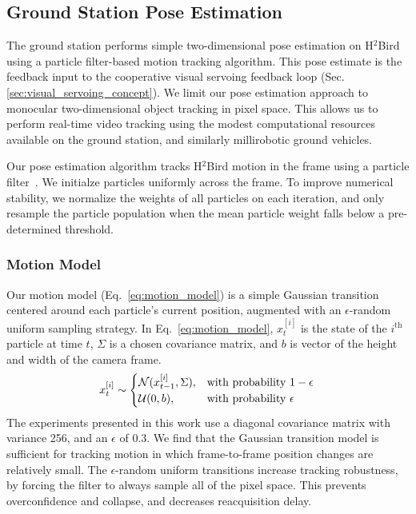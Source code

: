 \documentclass{aamas2013}
\begin{document}
\subsection{Ground Station Pose Estimation}
The ground station performs simple two-dimensional pose estimation on 
H$^2$Bird using a particle filter-based motion tracking algorithm. This pose 
estimate is the feedback input to the cooperative visual servoing feedback 
loop (Sec. \ref{sec:visual_servoing_concept}). We limit our pose estimation 
approach to monocular two-dimensional object tracking in pixel space. This 
allows us to perform real-time video tracking using the modest computational 
resources available on the ground station, and similarly millirobotic ground 
vehicles.

Our pose estimation algorithm tracks H$^2$Bird motion in the frame using a 
particle filter~\cite{thrun2005probabilistic}. We initialze particles 
uniformly across the frame. To improve numerical stability, we  normalize the 
weights of all particles on each iteration, and only resample the particle 
population when the mean particle weight falls below a pre-determined 
threshold.

\subsubsection{Motion Model}
Our motion model (Eq.~\ref{eq:motion_model}) is a simple Gaussian transition 
centered around each particle's current position, augmented with an 
$\epsilon$-random uniform sampling strategy. In Eq.~\ref{eq:motion_model}, 
$x^{[i]}_t$ is the state of the $i^\text{th}$ particle at time $t$, $\Sigma$ 
is a chosen covariance matrix, and $b$ is vector of the height and width of 
the camera frame.
\begin{equation}
\label{eq:motion_model}
x^{[i]}_t \sim \begin{cases}
\mathcal{N}(x^{[i]}_{t-1}, \Sigma), &\text{with probability } 1-\epsilon \\
\mathcal{U}(0,b),& \text{with probability } \epsilon \\
\end{cases}\\
\end{equation}
The experiments presented in this work use a diagonal covariance matrix 
with variance 256, and an $\epsilon$ of 0.3. We find that the Gaussian 
transition model is sufficient for tracking motion in which frame-to-frame 
position changes are relatively small. The $\epsilon$-random uniform 
transitions increase tracking robustness, by forcing the filter to always 
sample all of the pixel space. This prevents overconfidence and collapse, 
and decreases reacquisition delay. 
\end{document}
